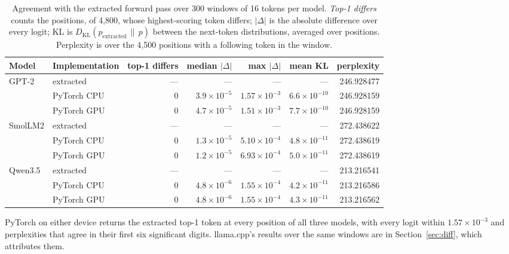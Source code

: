 \documentclass[11pt]{article}
\theoremstyle{plain}
\theoremstyle{definition}
\begin{document}
\begin{table}[t]
\centering
\footnotesize
\begin{tabular}{llrrrrr}
\toprule
\textbf{Model} & \textbf{Implementation} & \textbf{top-1 differs} & \textbf{median} $|\Delta|$ & \textbf{max} $|\Delta|$ & \textbf{mean KL} & \textbf{perplexity} \\
\midrule
GPT-2   & extracted     & ---  & ---                  & ---                  & ---                   & 246.928477 \\
        & PyTorch CPU   & 0    & $3.9\times10^{-5}$   & $1.57\times10^{-3}$  & $6.6\times10^{-10}$   & 246.928159 \\
        & PyTorch GPU   & 0    & $4.7\times10^{-5}$   & $1.51\times10^{-3}$  & $7.7\times10^{-10}$   & 246.928159 \\
\midrule
SmolLM2 & extracted     & ---  & ---                  & ---                  & ---                   & 272.438622 \\
        & PyTorch CPU   & 0    & $1.3\times10^{-5}$   & $5.10\times10^{-4}$  & $4.8\times10^{-11}$   & 272.438619 \\
        & PyTorch GPU   & 0    & $1.2\times10^{-5}$   & $6.93\times10^{-4}$  & $5.0\times10^{-11}$   & 272.438619 \\
\midrule
Qwen3.5 & extracted     & ---  & ---                  & ---                  & ---                   & 213.216541 \\
        & PyTorch CPU   & 0    & $4.8\times10^{-6}$   & $1.55\times10^{-4}$  & $4.2\times10^{-11}$   & 213.216586 \\
        & PyTorch GPU   & 0    & $4.8\times10^{-6}$   & $1.55\times10^{-4}$  & $4.3\times10^{-11}$   & 213.216562 \\
\bottomrule
\end{tabular}
\caption{Agreement with the extracted forward pass over 300 windows of 16 tokens
per model. \emph{Top-1 differs} counts the positions, of 4{,}800, whose
highest-scoring token differs; $|\Delta|$ is the absolute difference over every
logit; KL is $D_{\mathrm{KL}}(p_{\mathrm{extracted}} \,\|\, p)$ between the
next-token distributions, averaged over positions.
Perplexity is over the 4{,}500 positions with a following token in the window.}
\label{tab:agree}
\end{table}

PyTorch on either device returns the extracted top-1 token at every position of
all three models, with every logit within $1.57\times10^{-3}$ and perplexities
that agree in their first six significant digits. llama.cpp's results over the
same windows are in Section~\ref{sec:diff}, which attributes them.
\end{document}
